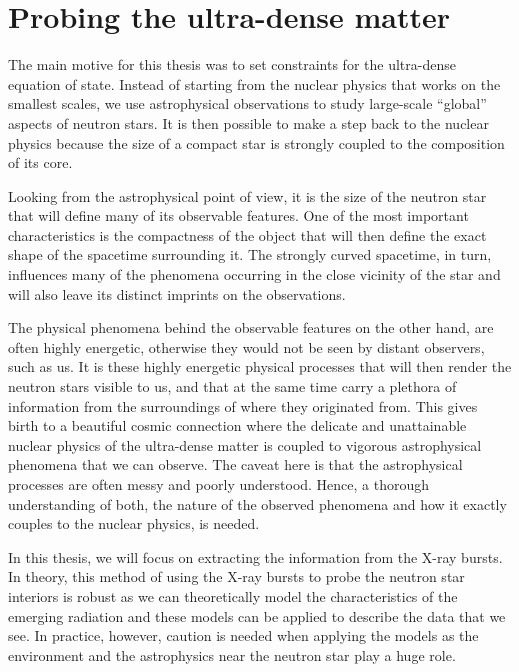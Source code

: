 \chapter{Probing the ultra-dense matter}

The main motive for this thesis was to set constraints for the ultra-dense equation of state.
Instead of starting from the nuclear physics that works on the smallest scales, we use astrophysical observations to study large-scale ``global'' aspects of neutron stars.
It is then possible to make a step back to the nuclear physics because the size of a compact star is strongly coupled to the composition of its core.

Looking from the astrophysical point of view, it is the size of the neutron star that will define many of its observable features.
One of the most important characteristics is the compactness of the object that will then define the exact shape of the spacetime surrounding it.
The strongly curved spacetime, in turn, influences many of the phenomena occurring in the close vicinity of the star and will also leave its distinct imprints on the observations.

The physical phenomena behind the observable features on the other hand, are often highly energetic, otherwise they would not be seen by distant observers, such as us.
It is these highly energetic physical processes that will then render the neutron stars visible to us, and that at the same time carry a plethora of information from the surroundings of where they originated from.
This gives birth to a beautiful cosmic connection where the delicate and unattainable nuclear physics of the ultra-dense matter is coupled to vigorous astrophysical phenomena that we can observe.
The caveat here is that the astrophysical processes are often messy and poorly understood.
Hence, a thorough understanding of both, the nature of the observed phenomena and how it exactly couples to the nuclear physics, is needed.

In this thesis, we will focus on extracting the information from the X-ray bursts.
In theory, this method of using the X-ray bursts to probe the neutron star interiors is robust as we can theoretically model the characteristics of the emerging radiation and these models can be applied to describe the data that we see. 
In practice, however, caution is needed when applying the models as the environment and the astrophysics near the neutron star play a huge role.


